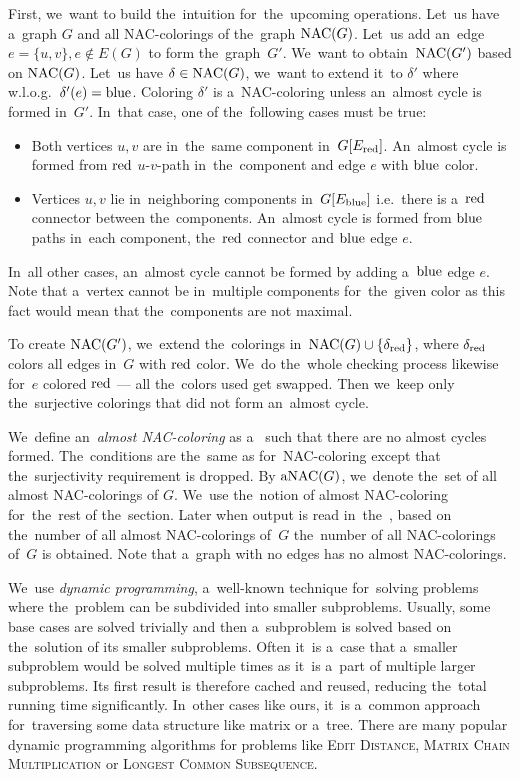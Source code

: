 First, we~want to build the~intuition for~the~upcoming operations.
Let~us have a~graph \( G \) and all NAC-colorings of the~graph \( \operatorname{NAC}(G) \).
Let~us add an~edge \( e = \{u, v\}, e \not\in E(G) \) to form the~graph~\( G' \).
We~want to obtain~\( \operatorname{NAC}(G') \) based on \( \operatorname{NAC}(G) \).
%
Let~us have \( \delta \in \operatorname{NAC}(G) \),
we~want to extend it~to \( \delta' \) where w.l.o.g.\ \( \delta'(e) = \text{blue} \).
Coloring \( \delta' \) is a~NAC-coloring unless an~almost cycle is formed in~\( G' \).
In~that case, one of the~following cases must be true:
%
\begin{itemize}
	\item Both vertices \( u, v \) are in~the~same component in~\( G[E_\text{red}] \).
	      An~almost cycle is formed
	      from \( \text{red} \) \( u \)-\( v \)-path in~the~component
	      and edge \( e \) with \( \text{blue} \) color.
	\item Vertices \( u, v \) lie in~neighboring components in~\( G[E_\text{blue}] \)
	      i.e.\ there is a~\( \text{red} \) connector between the~components.
	      An~almost cycle is formed from \( \text{blue} \) paths in~each component,
	      the~\( \text{red} \) connector and \( \text{blue} \) edge \( e \).
\end{itemize}
%
In~all other cases, an~almost cycle cannot be formed by adding a~\( \text{blue} \) edge \( e \).
Note that a~vertex cannot be in~multiple components for~the~given color
as this fact would mean that the~components are not maximal.

To create \( \operatorname{NAC}(G') \), we~extend the~colorings
in~\( \operatorname{NAC}(G) \cup \{ \delta_{\text{red}} \} \), where \( \delta_{\text{red}} \)
colors all edges in~\( G \) with \( \text{red} \) color.
We~do the~whole checking process likewise
for~\( e \) colored \( \text{red} \) --- all the~colors used get swapped.
Then we~keep only the~surjective colorings that did not form an~almost cycle.

We~define an~\emph{almost NAC-coloring}
as a~\rbcol{} such that there are no almost cycles formed.
The~conditions are the~same as for~NAC-coloring
except that the~surjectivity requirement is dropped.
By \( \operatorname{aNAC}(G) \), we~denote the~set of all almost NAC-colorings of \( G \).
We~use the~notion of almost NAC-coloring for~the~rest of the~section.
Later when output is read in~the~\RootNode{},
based on the~number of all almost NAC-colorings of~\( G \)
the~number of all NAC-colorings of~\( G \) is obtained.
Note that a~graph with no edges has no almost NAC-colorings.

We~use \emph{dynamic programming}, a~well-known technique for~solving problems
where the~problem can be subdivided into smaller subproblems.
Usually, some base cases are solved trivially and then a~subproblem
is solved based on the~solution of its smaller subproblems.
%
Often it~is a~case that a~smaller subproblem would be solved multiple times
as it~is a~part of multiple larger subproblems.
Its first result is therefore cached and reused,
reducing the~total running time significantly.
%
In~other cases like ours, it~is a~common approach for~traversing
some data structure like matrix or a~tree.
%
There are many popular dynamic programming algorithms
for problems like \textsc{Edit Distance}, \textsc{Matrix Chain Multiplication} or \textsc{Longest Common Subsequence}.

